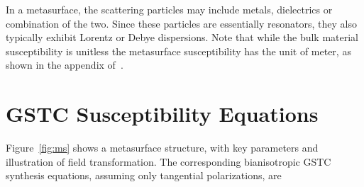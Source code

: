 \documentclass[journal]{IEEEtran}
\begin{document}
In a metasurface, the scattering particles may include metals, dielectrics or combination of the two. Since these particles are essentially resonators, they also typically exhibit Lorentz or Debye dispersions. Note that while the bulk material susceptibility is unitless the metasurface susceptibility has the unit of meter, as shown in the appendix of~\cite{Xiao_spherical_ms_synthesis2017}.


\section{GSTC Susceptibility Equations}\label{sec:ms_synthesis}
Figure~\ref{fig:ms} shows a metasurface structure, with key parameters and illustration of field transformation. The corresponding bianisotropic GSTC synthesis equations, assuming only tangential polarizations, are~\cite{Karim_ms_suscp_syn_2015, Kuester_AveragTransCond_2003, Idemen_GSTCBook_2011}
%
\end{document}
